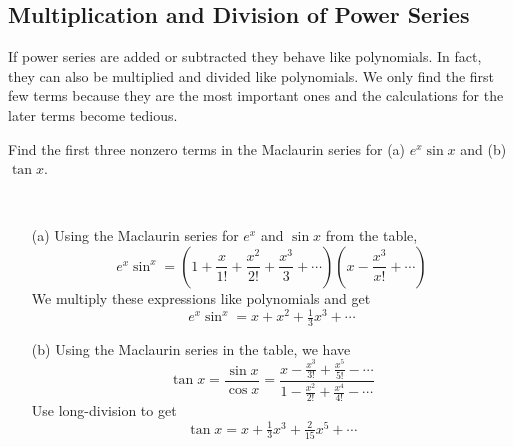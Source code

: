   \subsection*{Multiplication and Division of Power Series}
  If power series are added or subtracted they behave like polynomials. In fact, they can also be multiplied and divided like polynomials. We only find the first few terms because they are the most important ones and the calculations for the later terms become tedious.
  \begin{example}
    Find the first three nonzero terms in the Maclaurin series for (a) $e^x \sin x$ and (b) $\tan x$.
  \end{example}
  \begin{solution}
    \hphantom{ }\\
    \begin{enumerate}
      \item[(a)] Using the Maclaurin series for $e^x$ and $\sin x$ from the table,
      $$e^x \sin^x = \left( 1 + \frac{x}{1!} + \frac{x^2}{2!} + \frac{x^3}{3} + \cdots \right) \left( x - \frac{x^3}{x!} + \cdots \right)$$
      We multiply these expressions like polynomials and get
      $$e^x \sin^x = x + x^2 + \tfrac{1}{3}x^3 + \cdots$$
      \item[(b)] Using the Maclaurin series in the table, we have
      $$\tan x =\frac{\sin x}{\cos x} = \frac{x - \frac{x^3}{3!} + \frac{x^5}{5!} - \cdots}{1 - \frac{x^2}{2!} + \frac{x^4}{4!} - \cdots} $$
      Use long-division to get
      $$\tan x = x + \tfrac{1}{3}x^3 + \tfrac{2}{15}x^5 + \cdots $$
    \end{enumerate}
  \end{solution}
